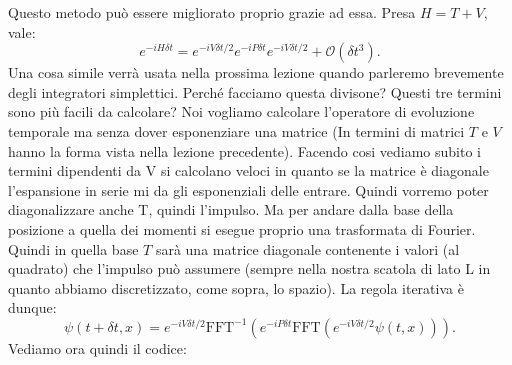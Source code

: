 \documentclass[10pt,a4paper]{article}
\begin{document}
Questo metodo può essere migliorato proprio grazie ad essa. Presa $H=T+V$, vale:
\begin{equation}
e^{-iH \delta t} = e^{-iV \delta t/2}e^{-iP \delta t}e^{-i V \delta t/2} + \mathcal{O}(\delta t^3).
\end{equation}
Una cosa simile verrà usata nella prossima lezione quando parleremo brevemente degli integratori simplettici. Perché facciamo questa divisone? Questi tre termini sono più facili da calcolare? Noi vogliamo calcolare l'operatore di evoluzione temporale ma senza dover esponenziare una matrice (In termini di matrici $T$ e $V$ hanno la forma vista nella lezione precedente). Facendo cosi vediamo subito i termini dipendenti da V si calcolano veloci in quanto se la matrice è diagonale l'espansione in serie mi da gli esponenziali delle entrare. Quindi vorremo poter diagonalizzare anche T, quindi l'impulso. Ma per andare dalla base della posizione a quella dei momenti si esegue proprio una trasformata di Fourier. Quindi in quella base $T$ sarà una matrice diagonale contenente i valori (al quadrato) che l'impulso può assumere (sempre nella nostra scatola di lato L in quanto abbiamo discretizzato, come sopra, lo spazio). La regola iterativa è dunque:
\begin{equation}
\psi(t+\delta t, x) = e^{-iV \delta t/2}\text{FFT}^{-1}(e^{-iP \delta t}\text{FFT}(e^{-i V \delta t/2}\psi(t, x))).
\end{equation}
Vediamo ora quindi il codice:
\end{document}
